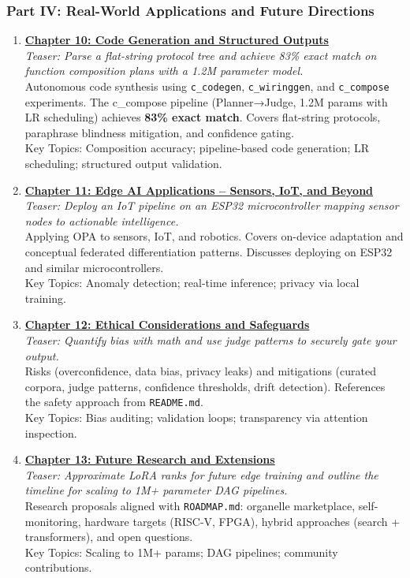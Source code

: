 \documentclass[
]{article}
\begin{document}
\subsubsection{Part IV: Real-World Applications and Future
Directions}\label{part-iv-real-world-applications-and-future-directions}

\begin{enumerate}
\def\labelenumi{\arabic{enumi}.}
\setcounter{enumi}{9}
\item
  \textbf{\href{10.md}{Chapter 10: Code Generation and Structured
  Outputs}}\\
  \emph{Teaser: Parse a flat-string protocol tree and achieve 83\% exact
  match on function composition plans with a 1.2M parameter model.}\\
  Autonomous code synthesis using \texttt{c\_codegen},
  \texttt{c\_wiringgen}, and \texttt{c\_compose} experiments. The
  c\_compose pipeline (Planner→Judge, 1.2M params with LR scheduling)
  achieves \textbf{83\% exact match}. Covers flat-string protocols,
  paraphrase blindness mitigation, and confidence gating.\\
  Key Topics: Composition accuracy; pipeline-based code generation; LR
  scheduling; structured output validation.
\item
  \textbf{\href{11.md}{Chapter 11: Edge AI Applications -- Sensors, IoT,
  and Beyond}}\\
  \emph{Teaser: Deploy an IoT pipeline on an ESP32 microcontroller
  mapping sensor nodes to actionable intelligence.}\\
  Applying OPA to sensors, IoT, and robotics. Covers on-device
  adaptation and conceptual federated differentiation patterns.
  Discusses deploying on ESP32 and similar microcontrollers.\\
  Key Topics: Anomaly detection; real-time inference; privacy via local
  training.
\item
  \textbf{\href{12.md}{Chapter 12: Ethical Considerations and
  Safeguards}}\\
  \emph{Teaser: Quantify bias with math and use judge patterns to
  securely gate your output.}\\
  Risks (overconfidence, data bias, privacy leaks) and mitigations
  (curated corpora, judge patterns, confidence thresholds, drift
  detection). References the safety approach from \texttt{README.md}.\\
  Key Topics: Bias auditing; validation loops; transparency via
  attention inspection.
\item
  \textbf{\href{13.md}{Chapter 13: Future Research and Extensions}}\\
  \emph{Teaser: Approximate LoRA ranks for future edge training and
  outline the timeline for scaling to 1M+ parameter DAG pipelines.}\\
  Research proposals aligned with \texttt{ROADMAP.md}: organelle
  marketplace, self-monitoring, hardware targets (RISC-V, FPGA), hybrid
  approaches (search + transformers), and open questions.\\
  Key Topics: Scaling to 1M+ params; DAG pipelines; community
  contributions.
\end{enumerate}
\end{document}
